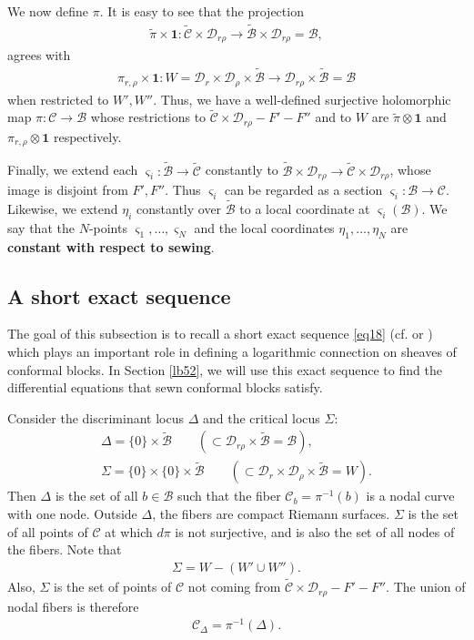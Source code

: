 \documentclass[12pt,a4paper,notitlepage]{article}
\theoremstyle{definition}
\theoremstyle{plain}
\newcommand{\mc}{\mathcal}
\newcommand{\wtd}{\widetilde}
\newcommand{\id}{\mathbf{1}}
\newcommand{\sgm}{\varsigma}
\numberwithin{equation}{section}
\begin{document}
We now define $\pi$. It is easy to see that the projection
\begin{align}
\wtd\pi\times \id:\wtd{\mc C}\times \mc D_{r\rho}\rightarrow \wtd{\mc B}\times \mc D_{r\rho}=\mc B, \label{eq68}
\end{align}
agrees with
\begin{gather}
\pi_{r,\rho}\times \id:W=\mc D_{r}\times\mc D_{\rho}\times\wtd{\mc B}\rightarrow \mc D_{r\rho}\times\wtd{\mc B}=\mc B \label{eq69}
\end{gather}
when restricted to $W',W''$.  Thus, we have a well-defined surjective holomorphic map $\pi:\mc C\rightarrow\mc B$ whose  restrictions to $\wtd{\mc C}\times \mc D_{r\rho}-F'-F''$ and to  $W$ are $\wtd\pi\otimes\id$ and $\pi_{r,\rho}\otimes\id$ respectively. 

Finally, we extend each $\sgm_i:\wtd{\mc B}\rightarrow\wtd{\mc C}$ constantly to $\wtd{\mc B}\times\mc D_{r\rho}\rightarrow\wtd{\mc C}\times\mc D_{r\rho}$, whose image is disjoint from $F',F''$. Thus $\sgm_i$ can be regarded as a section $\sgm_i:\mc B\rightarrow\mc C$. Likewise, we extend $\eta_i$ constantly over $\wtd{\mc B}$ to a local coordinate at $\sgm_i(\mc B)$. We say that  the $N$-points $\sgm_1,\dots,\sgm_N$ and the local coordinates $\eta_1,\dots,\eta_N$ are \textbf{constant with respect to sewing}. 



\subsection*{A short exact sequence}


The goal of this subsection is to recall a short exact sequence \eqref{eq18} (cf. \cite[Eq. (4.2.3)]{Ueno97} or \cite[Eq. (4.6)]{AU07}) which plays an important role in defining a logarithmic connection on sheaves of conformal blocks. In Section \ref{lb52}, we will use this exact sequence to find the differential equations that sewn conformal blocks satisfy.

Consider the discriminant locus $\Delta$ and the critical locus $\Sigma$:  
\begin{gather*}
\Delta=\{0\}\times\wtd{\mc B}\qquad (\subset\mc D_{r\rho}\times\wtd{\mc B}=\mc B),\\
\Sigma=\{0\}\times\{0\}\times\wtd{\mc B}\qquad (\subset\mc D_r\times\mc D_\rho\times\wtd{\mc B}=W).
\end{gather*}
Then $\Delta$ is the set of all $b\in\mc B$ such that the fiber $\mc C_b=\pi^{-1}(b)$ is a nodal curve with one node. Outside $\Delta$, the fibers are compact Riemann surfaces. $\Sigma$ is the set of all points of $\mc C$ at which $d\pi$ is not surjective, and is also the set of all nodes of the fibers. Note that
\begin{align*}
\Sigma=W-(W'\cup W'').
\end{align*}
Also, $\Sigma$ is  the set of points of $\mc C$ not coming from $\wtd{\mc C}\times \mc D_{r\rho}-F'- F''$. The union of nodal fibers is \index{C@$\mc C_\Delta$} therefore
\begin{align*}
\mc C_\Delta=\pi^{-1}(\Delta).
\end{align*}
\end{document}
